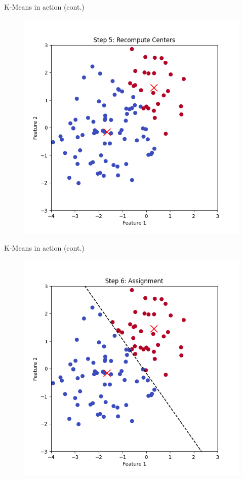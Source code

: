 \documentclass[serif, aspectratio=169]{beamer}
\begin{document}
\begin{frame}{K-Means in action (cont.)}
    \begin{figure}
        \centering
        \includegraphics[scale=0.45]{pic/figs/kmeans_step_5_recompute_centers.png}
    \end{figure}
\end{frame}
\begin{frame}{K-Means in action (cont.)}
    \begin{figure}
        \centering
        \includegraphics[scale=0.45]{pic/figs/kmeans_step_6_assignment.png}
    \end{figure}
\end{frame}
\end{document}
